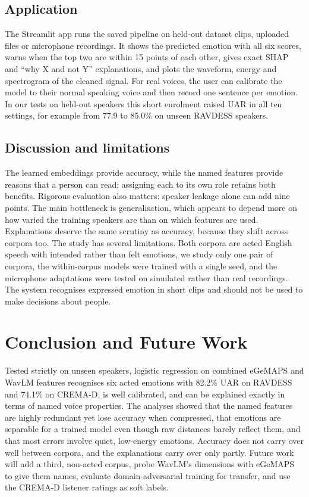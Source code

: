 \documentclass[conference]{IEEEtran}
\begin{document}
\subsection{Application}
The Streamlit app runs the saved pipeline on held-out dataset clips, uploaded files or microphone recordings. It shows the predicted emotion with all six scores, warns when the top two are within 15 points of each other, gives exact SHAP and ``why X and not Y'' explanations, and plots the waveform, energy and spectrogram of the cleaned signal. For real voices, the user can calibrate the model to their normal speaking voice and then record one sentence per emotion. In our tests on held-out speakers this short enrolment raised UAR in all ten settings, for example from 77.9 to 85.0\% on unseen RAVDESS speakers.

\subsection{Discussion and limitations}
The learned embeddings provide accuracy, while the named features provide reasons that a person can read; assigning each to its own role retains both benefits. Rigorous evaluation also matters: speaker leakage alone can add nine points. The main bottleneck is generalisation, which appears to depend more on how varied the training speakers are than on which features are used. Explanations deserve the same scrutiny as accuracy, because they shift across corpora too. The study has several limitations. Both corpora are acted English speech with intended rather than felt emotions, we study only one pair of corpora, the within-corpus models were trained with a single seed, and the microphone adaptations were tested on simulated rather than real recordings. The system recognises expressed emotion in short clips and should not be used to make decisions about people.

\section{Conclusion and Future Work}
Tested strictly on unseen speakers, logistic regression on combined eGeMAPS and WavLM features recognises six acted emotions with 82.2\% UAR on RAVDESS and 74.1\% on CREMA-D, is well calibrated, and can be explained exactly in terms of named voice properties. The analyses showed that the named features are highly redundant yet lose accuracy when compressed, that emotions are separable for a trained model even though raw distances barely reflect them, and that most errors involve quiet, low-energy emotions. Accuracy does not carry over well between corpora, and the explanations carry over only partly. Future work will add a third, non-acted corpus, probe WavLM's dimensions with eGeMAPS to give them names, evaluate domain-adversarial training for transfer, and use the CREMA-D listener ratings as soft labels.
\end{document}
